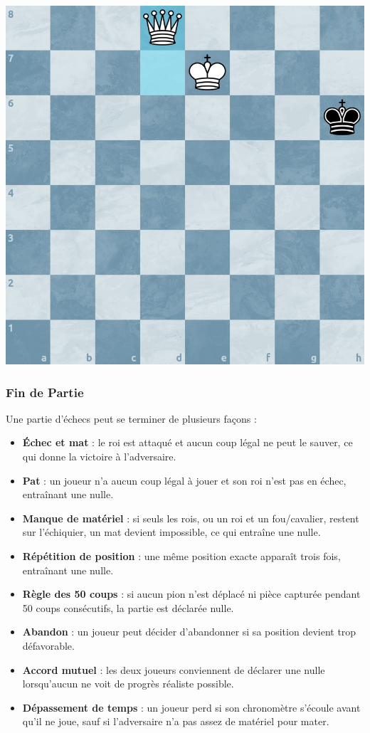 \documentclass{article}
\begin{document}
 \begin{minipage}{0.48\textwidth}
     \centering
     \includegraphics[width=\textwidth, height=\textwidth]{promotion2.png}
     \vspace{0.5cm}
 \end{minipage}

\subsubsection{Fin de Partie}
Une partie d'échecs peut se terminer de plusieurs façons :
\begin{itemize}
    \item \textbf{Échec et mat} : le roi est attaqué et aucun coup légal ne peut le sauver, ce qui donne la victoire à l'adversaire.
    \item \textbf{Pat} : un joueur n'a aucun coup légal à jouer et son roi n'est pas en échec, entraînant une nulle.
    \item \textbf{Manque de matériel} : si seuls les rois, ou un roi et un fou/cavalier, restent sur l'échiquier, un mat devient impossible, ce qui entraîne une nulle.
    \item \textbf{Répétition de position} : une même position exacte apparaît trois fois, entraînant une nulle.
    \item \textbf{Règle des 50 coups} : si aucun pion n'est déplacé ni pièce capturée pendant 50 coups consécutifs, la partie est déclarée nulle.
    \item \textbf{Abandon} : un joueur peut décider d'abandonner si sa position devient trop défavorable.
    \item \textbf{Accord mutuel} : les deux joueurs conviennent de déclarer une nulle lorsqu'aucun ne voit de progrès réaliste possible.
    \item \textbf{Dépassement de temps} : un joueur perd si son chronomètre s'écoule avant qu'il ne joue, sauf si l'adversaire n'a pas assez de matériel pour mater.
\end{itemize}
\end{document}
